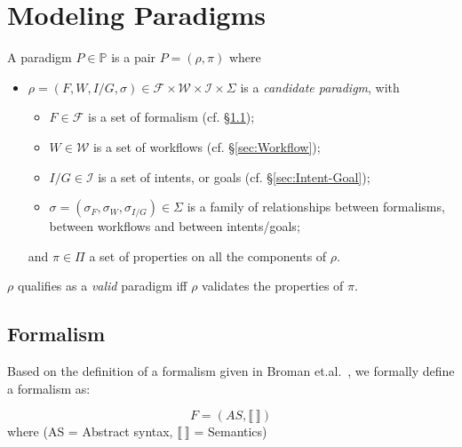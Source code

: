 \section{Modeling Paradigms}
\label{sec:Paradigms}


\begin{definition}[Paradigm]
    A paradigm $P\in \mathbb{P}$ is a pair $P = (\rho, \pi)$ where
    \begin{itemize}
        \item $\rho = (F, W, I/G, \sigma) \in \mathcal{F}\times \mathcal{W} \times \mathcal{I} \times \Sigma$ is a \emph{candidate paradigm}, with
        \begin{itemize}
            \item $F\in\mathcal{F}$ is a set of formalism (cf. \S \ref{sec:Formalism});
            
            \item $W\in \mathcal{W}$ is a set of workflows (cf. \S \ref{sec:Workflow});
            
            \item $I/G\in \mathcal{I}$ is a set of intents, or goals (cf. \S \ref{sec:Intent-Goal});
            
            \item $\sigma =(\sigma_{F}, \sigma_{W}, \sigma_{I/G}) \in \Sigma$ is a family of relationships between formalisms, between workflows and between intents/goals;
        \end{itemize}
        and $\pi\in \Pi$ a set of properties on all the components of $\rho$. 
    \end{itemize}
    $\rho$ qualifies as a \emph{valid} paradigm iff $\rho$ validates the properties of $\pi$.
\end{definition}


\subsection{Formalism}
\label{sec:Formalism}

Based on the definition of a formalism given in Broman et.al.~\cite{BromanViewpointsformalismslanguages2012}, we formally define a formalism as:
\begin{definition}[Formalism]
    $$F = (AS, \llbracket ~ \rrbracket) $$  where (AS = Abstract syntax, $\llbracket ~ \rrbracket$ = Semantics)
\end{definition}


